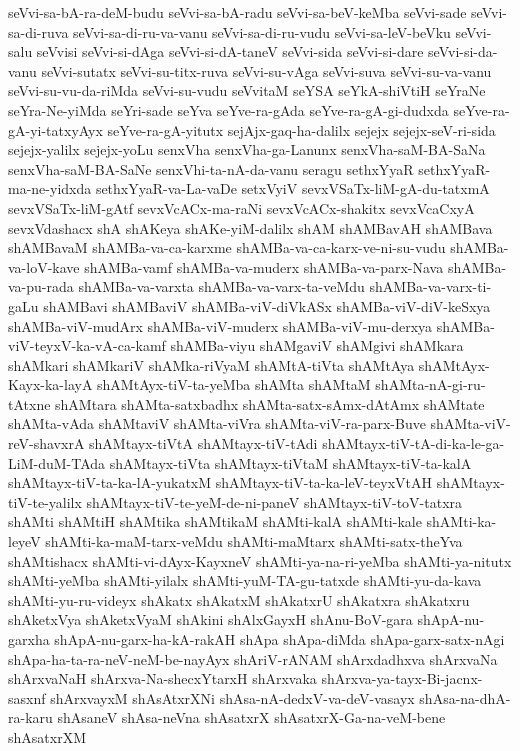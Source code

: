 {seVvi-sa-bA-ra-deM-budu
seVvi-sa-bA-radu
seVvi-sa-beV-keMba
seVvi-sade
seVvi-sa-di-ruva
seVvi-sa-di-ru-va-vanu
seVvi-sa-di-ru-vudu
seVvi-sa-leV-beVku
seVvi-salu
seVvisi
seVvi-si-dAga
seVvi-si-dA-taneV
seVvi-sida
seVvi-si-dare
seVvi-si-da-vanu
seVvi-sutatx
seVvi-su-titx-ruva
seVvi-su-vAga
seVvi-suva
seVvi-su-va-vanu
seVvi-su-vu-da-riMda
seVvi-su-vudu
seVvitaM
seYSA
seYkA-shiVtiH
seYraNe
seYra-Ne-yiMda
seYri-sade
seYva
seYve-ra-gAda
seYve-ra-gA-gi-dudxda
seYve-ra-gA-yi-tatxyAyx
seYve-ra-gA-yitutx
sejAjx-gaq-ha-dalilx
sejejx
sejejx-seV-ri-sida
sejejx-yalilx
sejejx-yoLu
senxVha
senxVha-ga-Lanunx
senxVha-saM-BA-SaNa
senxVha-saM-BA-SaNe
senxVhi-ta-nA-da-vanu
seragu
sethxYyaR
sethxYyaR-ma-ne-yidxda
sethxYyaR-va-La-vaDe
setxVyiV
sevxVSaTx-liM-gA-du-tatxmA
sevxVSaTx-liM-gAtf
sevxVcACx-ma-raNi
sevxVcACx-shakitx
sevxVcaCxyA
sevxVdashacx
shA
shAKeya
shAKe-yiM-dalilx
shAM
shAMBavAH
shAMBava
shAMBavaM
shAMBa-va-ca-karxme
shAMBa-va-ca-karx-ve-ni-su-vudu
shAMBa-va-loV-kave
shAMBa-vamf
shAMBa-va-muderx
shAMBa-va-parx-Nava
shAMBa-va-pu-rada
shAMBa-va-varxta
shAMBa-va-varx-ta-veMdu
shAMBa-va-varx-ti-gaLu
shAMBavi
shAMBaviV
shAMBa-viV-diVkASx
shAMBa-viV-diV-keSxya
shAMBa-viV-mudArx
shAMBa-viV-muderx
shAMBa-viV-mu-derxya
shAMBa-viV-teyxV-ka-vA-ca-kamf
shAMBa-viyu
shAMgaviV
shAMgivi
shAMkara
shAMkari
shAMkariV
shAMka-riVyaM
shAMtA-tiVta
shAMtAya
shAMtAyx-Kayx-ka-layA
shAMtAyx-tiV-ta-yeMba
shAMta
shAMtaM
shAMta-nA-gi-ru-tAtxne
shAMtara
shAMta-satxbadhx
shAMta-satx-sAmx-dAtAmx
shAMtate
shAMta-vAda
shAMtaviV
shAMta-viVra
shAMta-viV-ra-parx-Buve
shAMta-viV-reV-shavxrA
shAMtayx-tiVtA
shAMtayx-tiV-tAdi
shAMtayx-tiV-tA-di-ka-le-ga-LiM-duM-TAda
shAMtayx-tiVta
shAMtayx-tiVtaM
shAMtayx-tiV-ta-kalA
shAMtayx-tiV-ta-ka-lA-yukatxM
shAMtayx-tiV-ta-ka-leV-teyxVtAH
shAMtayx-tiV-te-yalilx
shAMtayx-tiV-te-yeM-de-ni-paneV
shAMtayx-tiV-toV-tatxra
shAMti
shAMtiH
shAMtika
shAMtikaM
shAMti-kalA
shAMti-kale
shAMti-ka-leyeV
shAMti-ka-maM-tarx-veMdu
shAMti-maMtarx
shAMti-satx-theYva
shAMtishacx
shAMti-vi-dAyx-KayxneV
shAMti-ya-na-ri-yeMba
shAMti-ya-nitutx
shAMti-yeMba
shAMti-yilalx
shAMti-yuM-TA-gu-tatxde
shAMti-yu-da-kava
shAMti-yu-ru-videyx
shAkatx
shAkatxM
shAkatxrU
shAkatxra
shAkatxru
shAketxVya
shAketxVyaM
shAkini
shAlxGayxH
shAnu-BoV-gara
shApA-nu-garxha
shApA-nu-garx-ha-kA-rakAH
shApa
shApa-diMda
shApa-garx-satx-nAgi
shApa-ha-ta-ra-neV-neM-be-nayAyx
shAriV-rANAM
shArxdadhxva
shArxvaNa
shArxvaNaH
shArxva-Na-shecxYtarxH
shArxvaka
shArxva-ya-tayx-Bi-jacnx-sasxnf
shArxvayxM
shAsAtxrXNi
shAsa-nA-dedxV-va-deV-vasayx
shAsa-na-dhA-ra-karu
shAsaneV
shAsa-neVna
shAsatxrX
shAsatxrX-Ga-na-veM-bene
shAsatxrXM
}
